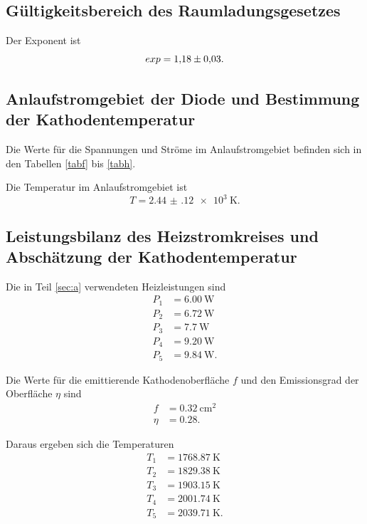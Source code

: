 \subsection{Gültigkeitsbereich des Raumladungsgesetzes}
Der Exponent ist
\begin{equation*}
    exp = \num{1.18 \pm 0.03}.
\end{equation*}

\subsection{Anlaufstromgebiet der Diode und Bestimmung der Kathodentemperatur}
Die Werte für die Spannungen und Ströme im Anlaufstromgebiet
befinden sich in den Tabellen \ref{tabf} bis \ref{tabh}.





\noindent Die Temperatur im Anlaufstromgebiet ist
\begin{equation*}
    T = \SI{2.44(12)e3}{\kelvin}.
\end{equation*}

\subsection{Leistungsbilanz des Heizstromkreises und Abschätzung der Kathodentemperatur}
Die in Teil \ref{sec:a} verwendeten Heizleistungen sind
\begin{align*}
    P_\text{1} &= \SI{6.00}{\watt} \\
    P_\text{2} &= \SI{6.72}{\watt} \\
    P_\text{3} &= \SI{7.7}{\watt} \\
    P_\text{4} &= \SI{9.20}{\watt} \\
    P_\text{5} &= \SI{9.84}{\watt}.
\end{align*}

\noindent Die Werte für die emittierende Kathodenoberfläche $f$ und den
Emissionsgrad der Oberfläche $\eta$ sind
\begin{align*}
    f &= \SI{0.32}{\centi\meter\squared} \\
    \eta &= \num{0.28}.
\end{align*}

\noindent Daraus ergeben sich die Temperaturen
\begin{align*}
    T_\text{1} &= \SI{1768.87}{\kelvin} \\
    T_\text{2} &= \SI{1829.38}{\kelvin} \\
    T_\text{3} &= \SI{1903.15}{\kelvin} \\
    T_\text{4} &= \SI{2001.74}{\kelvin} \\
    T_\text{5} &= \SI{2039.71}{\kelvin}.
\end{align*}

